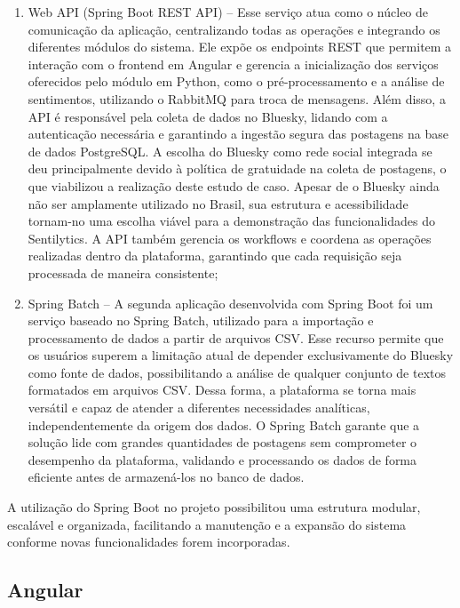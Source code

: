 \documentclass[
	12pt,				%
	oneside,			%
	a4paper,			%
	english,			%
	french,				%
	spanish,			%
	brazil				%
	]{abntex2}
\begin{document}
\begin{enumerate}
\def\labelenumi{\arabic{enumi})}
\item
  Web API (Spring Boot REST API) -- Esse serviço atua como o núcleo de
  comunicação da aplicação, centralizando todas as operações e
  integrando os diferentes módulos do sistema. Ele expõe os endpoints
  REST que permitem a interação com o frontend em Angular e gerencia a
  inicialização dos serviços oferecidos pelo módulo em Python, como o
  pré-processamento e a análise de sentimentos, utilizando o RabbitMQ
  para troca de mensagens. Além disso, a API é responsável pela coleta
  de dados no Bluesky, lidando com a autenticação necessária e
  garantindo a ingestão segura das postagens na base de dados
  PostgreSQL. A escolha do Bluesky como rede social integrada se deu
  principalmente devido à política de gratuidade na coleta de postagens,
  o que viabilizou a realização deste estudo de caso. Apesar de o
  Bluesky ainda não ser amplamente utilizado no Brasil, sua estrutura e
  acessibilidade tornam-no uma escolha viável para a demonstração das
  funcionalidades do Sentilytics. A API também gerencia os workflows e
  coordena as operações realizadas dentro da plataforma, garantindo que
  cada requisição seja processada de maneira consistente;
\item
  Spring Batch -- A segunda aplicação desenvolvida com Spring Boot foi
  um serviço baseado no Spring Batch, utilizado para a importação e
  processamento de dados a partir de arquivos CSV. Esse recurso permite
  que os usuários superem a limitação atual de depender exclusivamente
  do Bluesky como fonte de dados, possibilitando a análise de qualquer
  conjunto de textos formatados em arquivos CSV. Dessa forma, a
  plataforma se torna mais versátil e capaz de atender a diferentes
  necessidades analíticas, independentemente da origem dos dados. O
  Spring Batch garante que a solução lide com grandes quantidades de
  postagens sem comprometer o desempenho da plataforma, validando e
  processando os dados de forma eficiente antes de armazená-los no banco
  de dados.
\end{enumerate}

A utilização do Spring Boot no projeto possibilitou uma estrutura
modular, escalável e organizada, facilitando a manutenção e a expansão
do sistema conforme novas funcionalidades forem incorporadas.

\hypertarget{angular}{%
\subsection{Angular}\label{angular}}
\end{document}
